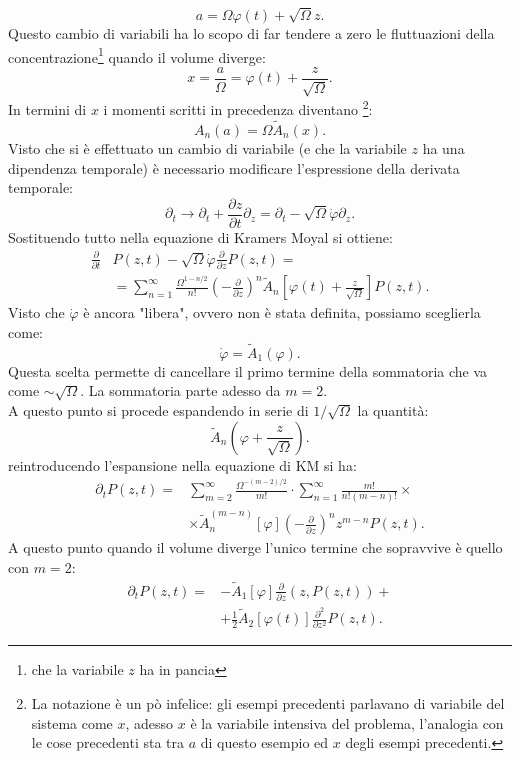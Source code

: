 \[
    a = \Omega\varphi (t) + \sqrt{\Omega} z
.\] 
Questo cambio di variabili ha lo scopo di far tendere a zero le fluttuazioni della concentrazione\footnote{che la variabile $z$ ha in pancia} quando il volume diverge:
\[
    x = \frac{a}{\Omega} = \varphi(t) + \frac{z}{\sqrt{\Omega}}
.\] 
In termini di $x$ i momenti scritti in precedenza diventano
\footnote{La notazione è un pò infelice: gli esempi precedenti parlavano di variabile del sistema come $x$, adesso $x$ è la variabile intensiva del problema, l'analogia con le cose precedenti sta tra $a$ di questo esempio ed $x$ degli esempi precedenti.}:
\[
    A_n(a)  = \Omega \tilde{A}_n(x) 
.\] 
Visto che si è effettuato un cambio di variabile (e che la variabile $z$ ha una dipendenza temporale) è necessario modificare l'espressione della derivata temporale:
\[
    \partial_t \to \partial_t + \frac{\partial z}{\partial t} \partial_z = \partial_t - \sqrt{\Omega}\dot{\varphi}\partial_z 
.\] 
Sostituendo tutto nella equazione di Kramers Moyal si ottiene: 
\[\begin{aligned}
    \frac{\partial }{\partial t} &P(z, t) - \sqrt{\Omega} \dot{\varphi}\frac{\partial }{\partial z} P(z,t) = \\
					  &= \sum_{n=1}^{\infty} \frac{\Omega^{1-n /2}}{n!} \left(-\frac{\partial }{\partial z}\right)^n \tilde{A}_n
					  \left[\varphi (t) + \frac{z}{\sqrt{\Omega} }\right]P(z, t)
.\end{aligned}\]
Visto che $\dot{\varphi}$ è ancora "libera", ovvero non è stata definita, possiamo sceglierla come:
\[
    \dot{\varphi  } = \tilde{A}_1(\varphi) 
.\] 
Questa scelta permette di cancellare il primo termine della sommatoria che va come $\sim \sqrt{\Omega} $. La sommatoria parte adesso da $m=2$.\\
A questo punto si procede espandendo in serie di $1 /\sqrt{\Omega} $  la quantità:
\[
    \tilde{A}_n (\varphi + \frac{z}{\sqrt{\Omega}})
.\] 
reintroducendo l'espansione nella equazione di KM si ha:
\[\begin{aligned}
    \partial_{t}P(z,t) = & \sum_{m=2}^{\infty} \frac{\Omega^{-(m-2) /2}}{m!} \cdot \sum_{n=1}^{\infty} \frac{m!}{n!(m-n)!} \times \\
			 &\times \tilde{A}_n^{(m-n)}\left[\varphi\right]\left(-\frac{\partial }{\partial z}\right)^nz^{m-n}P(z,t) 
.\end{aligned}\]
A questo punto quando il volume diverge l'unico termine che sopravvive è quello con $m = 2$:
\[\begin{aligned}
    \partial_{t}P(z,t) =& - \tilde{A}_1\left[\varphi\right] \frac{\partial }{\partial z} (z,P(z,t)) +\\
		       & + \frac{1}{2}\tilde{A}_2\left[\varphi (t) \right] \frac{\partial ^2}{\partial z^2} P(z,t) 
.\end{aligned}\]
